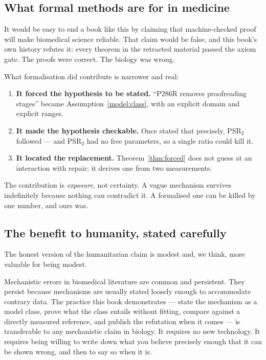 \subsection{What formal methods are for in medicine}

It would be easy to end a book like this by claiming that machine-checked proof
will make biomedical science reliable. That claim would be false, and this book's
own history refutes it: every theorem in the retracted material passed the axiom
gate. The proofs were correct. The biology was wrong.

What formalisation did contribute is narrower and real:

\begin{enumerate}[leftmargin=*,itemsep=2pt]
  \item \textbf{It forced the hypothesis to be stated.} ``P286R removes
        proofreading stages'' became Assumption~\ref{model:class}, with an
        explicit domain and explicit ranges.
  \item \textbf{It made the hypothesis checkable.} Once stated that precisely,
        PSR$_2$ followed --- and PSR$_2$ had no free parameters, so a single
        ratio could kill it.
  \item \textbf{It located the replacement.} Theorem~\ref{thm:forced} does not
        guess at an interaction with repair; it derives one from two
        measurements.
\end{enumerate}

The contribution is \emph{exposure}, not certainty. A vague mechanism survives
indefinitely because nothing can contradict it. A formalised one can be killed by
one number, and ours was.

\subsection{The benefit to humanity, stated carefully}

The honest version of the humanitarian claim is modest and, we think, more
valuable for being modest.

Mechanistic errors in biomedical literature are common and persistent. They
persist because mechanisms are usually stated loosely enough to accommodate
contrary data. The practice this book demonstrates --- state the mechanism as a
model class, prove what the class entails without fitting, compare against a
directly measured reference, and publish the refutation when it comes --- is
transferable to any mechanistic claim in biology. It requires no new technology.
It requires being willing to write down what you believe precisely enough that it
can be shown wrong, and then to say so when it is.

